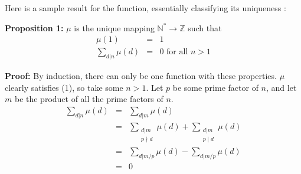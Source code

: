 \documentclass[12pt]{article}
\newcommand{\mb}{\mathbb}
\newcommand{\Z}{\mb{Z}}
\newcommand{\<}{\langle}
\renewcommand{\>}{\rangle}
\newcommand{\Nstar}{\mathbb{N}^{*}}
\begin{document}
 
 

Here is a sample result for the function, essentially classifying its uniqueness :

\noindent
\textbf{Proposition 1:} $\mu$ is the unique mapping $\Nstar\to\Z$ such that
\begin{eqnarray}
\mu(1)&=&1 \\
\sum_{d|n}\mu(d)&=&0\textrm{ for all }n>1
\end{eqnarray}

\noindent
\textbf{Proof:} By induction, there can only be one function with these
properties. $\mu$ clearly satisfies (1), so take some $n>1$. Let $p$ be
some prime factor of $n$, and let $m$ be the product of all the prime
factors of $n$.
\begin{eqnarray*}
\sum_{d|n}\mu(d)&=&\sum_{d|m}\mu(d) \\
&=&\sum_{\substack{d|m\\p\nmid d}}\mu(d) +\sum_{\substack{d|m\\p\mid d}}\mu(d) \\
&=&\sum_{d|m/p}\mu(d)-\sum_{d|m/p}\mu(d) \\
&=&0
\end{eqnarray*}
\end{document}
